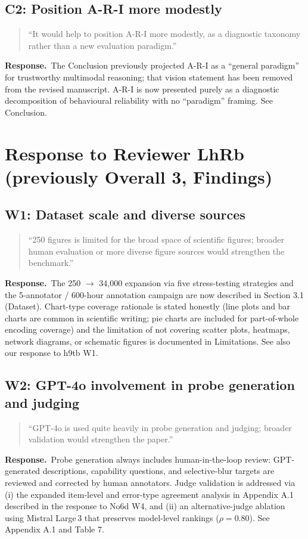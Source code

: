 \documentclass[11pt]{article}
\newcommand{\revsec}[1]{\textcolor{revisiongreen}{#1}}
\newenvironment{reviewercomment}{%
  \begin{quote}\small\itshape
}{%
  \end{quote}
}
\newcommand{\response}{\noindent\textbf{Response.}~}
\newcommand{\revisionitem}[3]{%
  \subsection{#1}
  \begin{reviewercomment}
  ``#2''
  \end{reviewercomment}
  \response #3\par
}
\begin{document}
\revisionitem
{C2: Position A-R-I more modestly}
{It would help to position A-R-I more modestly, as a diagnostic taxonomy rather than a new evaluation paradigm.}
{The Conclusion previously projected A-R-I as a ``general paradigm'' for trustworthy multimodal reasoning; that vision statement has been removed from the revised manuscript. A-R-I is now presented purely as a diagnostic decomposition of behavioural reliability with no ``paradigm'' framing. See \revsec{Conclusion}.}

\section{Response to Reviewer LhRb (previously Overall 3, Findings)}

\revisionitem
{W1: Dataset scale and diverse sources}
{250 figures is limited for the broad space of scientific figures; broader human evaluation or more diverse figure sources would strengthen the benchmark.}
{The 250 $\to$ 34{,}000 expansion via five stress-testing strategies and the 5-annotator / 600-hour annotation campaign are now described in \revsec{Section 3.1 (Dataset)}. Chart-type coverage rationale is stated honestly (line plots and bar charts are common in scientific writing; pie charts are included for part-of-whole encoding coverage) and the limitation of not covering scatter plots, heatmaps, network diagrams, or schematic figures is documented in \revsec{Limitations}. See also our response to h9tb W1.}

\revisionitem
{W2: GPT-4o involvement in probe generation and judging}
{GPT-4o is used quite heavily in probe generation and judging; broader validation would strengthen the paper.}
{Probe generation always includes human-in-the-loop review: GPT-generated descriptions, capability questions, and selective-blur targets are reviewed and corrected by human annotators. Judge validation is addressed via (i) the expanded item-level and error-type agreement analysis in \revsec{Appendix A.1} described in the response to No6d W4, and (ii) an alternative-judge ablation using Mistral Large\,3 that preserves model-level rankings ($\rho = 0.80$). See \revsec{Appendix A.1} and \revsec{Table 7}.}
\end{document}
